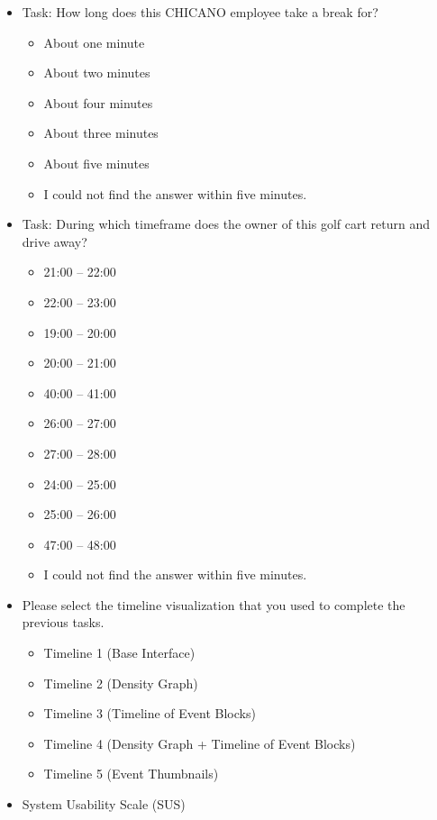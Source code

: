 \documentclass[doublespace,draft,nopageskip]{VTthesis} %
\begin{document}
\begin{itemize}
    \item Task: How long does this CHICANO employee take a break for?
    \begin{itemize}
        \item About one minute
        \item About two minutes
        \item About four minutes
        \item About three minutes
        \item About five minutes
        \item I could not find the answer within five minutes.
    \end{itemize}
    \item Task: During which timeframe does the owner of this golf cart return and drive away?
    \begin{itemize}
        \item 21:00 – 22:00
        \item 22:00 – 23:00
        \item 19:00 – 20:00
        \item 20:00 – 21:00
        \item 40:00 – 41:00
        \item 26:00 – 27:00
        \item 27:00 – 28:00
        \item 24:00 – 25:00
        \item 25:00 – 26:00
        \item 47:00 – 48:00
        \item I could not find the answer within five minutes.
    \end{itemize}
    \item Please select the timeline visualization that you used to complete the previous tasks.
    \begin{itemize}
        \item Timeline 1 (Base Interface)
        \item Timeline 2 (Density Graph)
        \item Timeline 3 (Timeline of Event Blocks)
        \item Timeline 4 (Density Graph + Timeline of Event Blocks)
        \item Timeline 5 (Event Thumbnails)
    \end{itemize}
    \item System Usability Scale (SUS)
    \begin{itemize}

\end{itemize}
\end{itemize}
\end{document}
